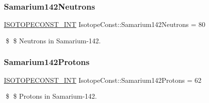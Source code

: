 \subsubsection{\texorpdfstring{Samarium142\+Neutrons}{Samarium142Neutrons}}
{\footnotesize\ttfamily \mbox{\hyperlink{group___isotope_const-_macros_ga5f18360b3e99483a35c32d789e62621c}{I\+S\+O\+T\+O\+P\+E\+C\+O\+N\+S\+T\+\_\+\+I\+NT}} Isotope\+Const\+::\+Samarium142\+Neutrons = 80}

\$ \$ Neutrons in Samarium-\/142. \mbox{\label{group___isotope_const-_samarium-_sm142_ga9c79a4fc04fceaa2c3eaccd34d45c1da}} 
\subsubsection{\texorpdfstring{Samarium142\+Protons}{Samarium142Protons}}
{\footnotesize\ttfamily \mbox{\hyperlink{group___isotope_const-_macros_ga5f18360b3e99483a35c32d789e62621c}{I\+S\+O\+T\+O\+P\+E\+C\+O\+N\+S\+T\+\_\+\+I\+NT}} Isotope\+Const\+::\+Samarium142\+Protons = 62}

\$ \$ Protons in Samarium-\/142. 